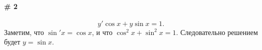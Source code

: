 \documentclass[12pt]{report}
\begin{document}
\paragraph{\# 2}
\[
  y'\cos x + y\sin x = 1.
\]
Заметим, что $\sin'x = \cos x$, и что $\cos^2x + \sin^2x = 1$.
Следовательно решением будет $y = \sin x$.
\end{document}
